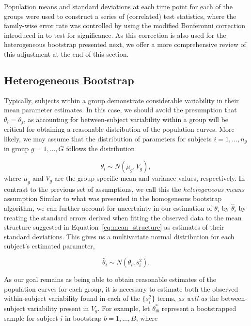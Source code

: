 Population means and standard deviations at each time point for each of the groups were used to construct a series of (correlated) test statistics, where the family-wise error rate was controlled by using the modified Bonferonni correction introduced in \citet{oleson2017detecting} to test for significance. As this correction is also used for the heterogeneous bootstrap presented next, we offer a more comprehensive review of this adjustment at the end of this section. 



\subsection{Heterogeneous Bootstrap}

Typically, subjects within a group demonstrate considerable variability in their mean parameter estimates. In this case, we should avoid the presumption that $\theta_i = \theta_j$, as accounting for between-subject variability within a group will be critical for obtaining a reasonable distribution of the population curves. More likely, we may assume that the distribution of parameters for subjects $i = 1, \dots, n_g$ in group $g = 1, \dots, G$ follows the distribution

\begin{equation}\label{eq:theta_i_dist}
\theta_i \sim N(\mu_{g}, V_{g}),
\end{equation}
where $\mu_g$ and $V_g$ are the group-specific mean and variance values, respectively. In contrast to the previous set of assumptions, we call this the \emph{heterogeneous means} assumption Similar to what was presented in the homogeneous bootstrap algorithm, we can further account for uncertainty in our estimation of $\theta_i$ by $\hat{\theta}_i$ by treating the standard errors derived when fitting the observed data to the mean structure suggested in Equation~\ref{eq:mean_structure} as estimates of their standard deviations. This gives us a multivariate normal distribution for each subject's estimated parameter, 

\begin{equation}
\hat{\theta}_i \sim N(\theta_i, s_i^2).
\end{equation}

As our goal remains as being able to obtain reasonable estimates of the population curves for each group, it is necessary to estimate both the observed within-subject variability found in each of the $\{s_i^2\}$ terms, \textit{as well as} the between-subject variability present in $V_{g}$. For example, let $\theta^*_{ib}$ represent a bootstrapped sample for subject $i$ in bootstrap $b = 1, \dots, B$, where

